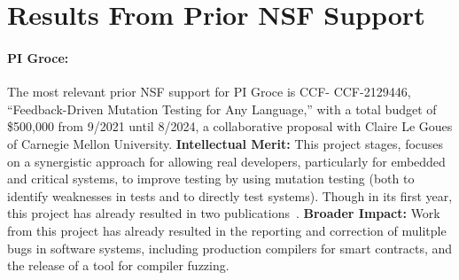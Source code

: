 \section{Results From Prior NSF Support}

\paragraph{PI Groce:}
The most relevant prior NSF support for PI Groce is CCF-
CCF-2129446, ``Feedback-Driven Mutation Testing for Any Language,'' with a total budget of \$500,000 from 9/2021 until 8/2024,
a collaborative proposal with Claire Le Goues of Carnegie Mellon
University. {\bf Intellectual Merit:} This project
stages, focuses on a synergistic approach for allowing real developers,
particularly for embedded and critical systems,
to improve testing by using mutation testing (both to identify
weaknesses in tests and to directly test systems).  Though in its first
year,  this project has already resulted in two
publications~\cite{cc2022,seip2022}. {\bf
  Broader
  Impact:}  Work from this project has already
resulted in the reporting and correction of mulitple bugs in software
systems, including production compilers for smart contracts, and the
release of a tool for compiler fuzzing.

